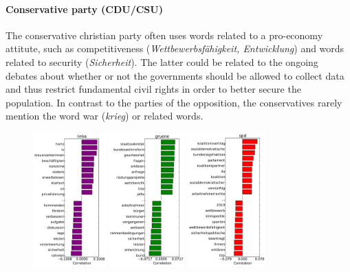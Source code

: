 \documentclass[runningheads,a4paper]{llncs}
\begin{document}
\paragraph{\bf Conservative party (CDU/CSU)}
The conservative christian party often uses words related to a pro-economy attitute, such as competitiveness ({\em Wettbewerbsf\"ahigkeit, Entwicklung}) and words related to security ({\em Sicherheit}). The latter could be related to the ongoing debates about whether or not the governments should be allowed to collect data and thus restrict fundamental civil rights in order to better secure the population. In contrast to the parties of the opposition, the conservatives rarely mention the word war ({\em krieg}) or related words.


\begin{figure}
\begin{center}
\includegraphics[width=2.8cm]{images/party_word_correlations-linke-18.pdf} 
\includegraphics[width=2.9cm]{images/party_word_correlations-gruene-18.pdf} 
\includegraphics[width=3cm]{images/party_word_correlations-spd-18.pdf} 

\end{center}
\end{figure}
\end{document}
